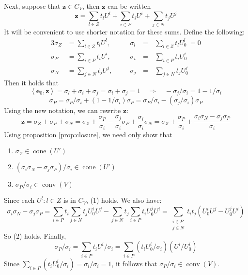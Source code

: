 \documentclass[fleqn]{article}
\renewcommand{\vec}[1]{\mathbf{#1}}
\DeclareMathOperator{\cone}{cone}
\DeclareMathOperator{\conv}{conv}
\newcommand{\ip}[2]{\left\langle #1, #2 \right\rangle}
\newcommand{\0}{\vec{0}}
\newcommand{\z}{\vec{z}}
\newcommand{\e}{\vec{e}}
\newcommand{\Uiz}{U^i_{0}}
\newcommand{\Ujz}{U^j_{0}}
\newcommand{\Ulz}{U^l_{0}}
\newcommand{\Psum}{\sum_{i\in P}}
\newcommand{\Nsum}{\sum_{j\in N}}
\newcommand{\Zsum}{\sum_{l\in Z}}
\newcommand{\NPsum}{\sum_{\substack{i\in P \\ j\in N}}}
\begin{document}
Next, suppose that $\z \in C_V$, then $\z$ can be written
\[ \z = \Zsum t_l U^l + \Psum t_i U^i + \Nsum t_j U^j \]
It will be convenient to use shorter notation for these sums.  Define the following:
\begin{alignat*}{3}
  \sigma_Z &= \Zsum t_l U^l, \quad &&\sigma_l \,&=&\, \Zsum t_l \Ulz \;= 0\\
  \sigma_P &= \Psum t_i U^i, \quad &&\sigma_i \,&=&\, \Psum t_i \Uiz \\
  \sigma_N &= \Nsum t_j U^j, \quad &&\sigma_j \,&=&\, \Nsum t_j \Ujz
\end{alignat*}
Then it holds that
\[ \ip{\e_0}{\z} = \sigma_l + \sigma_i + \sigma_j = \sigma_i + \sigma_j = 1 
      \quad\Rightarrow\quad -\sigma_j/\sigma_i = 1 - 1/\sigma_i \]
\[ \sigma_P = \sigma_P/\sigma_i + (1-1/\sigma_i)\sigma_P 
            = \sigma_P/\sigma_i - (\sigma_j/\sigma_i)\sigma_P \]
Using the new notation, we can rewrite $\z$:
\[ \z = \sigma_Z + \sigma_P + \sigma_N 
      = \sigma_Z + \frac{\sigma_P}{\sigma_i} - \frac{\sigma_j}{\sigma_i}\sigma_P
                 + \frac{\sigma_i}{\sigma_i}\sigma_N 
      = \sigma_Z + \frac{\sigma_P}{\sigma_i} + 
                   \frac{\sigma_i\sigma_N - \sigma_j\sigma_P}{\sigma_i}
\]
Using proposition \ref{prop:closure}, we need only show that 
\begin{enumerate}
  \item $\sigma_Z \in \cone(U')$
  \item $(\sigma_i\sigma_N - \sigma_j\sigma_P)/\sigma_i \in \cone(U')$ 
  \item $\sigma_P/\sigma_i \in \conv(V)$
\end{enumerate}
Since each $U^l : l \in Z$ is in $C_V$, (1) holds.  We also have:
\[ \sigma_i\sigma_N - \sigma_j\sigma_P = 
    \Psum t_i \Nsum t_j \Uiz U^j - \Nsum t_j \Psum t_i \Ujz U^i = 
    \NPsum t_i t_j(\Uiz U^j - \Ujz U^i) \]
So (2) holds.  Finally,
\[ \sigma_P/\sigma_i = \Psum t_i U^i / \sigma_i = \Psum (t_i \Uiz/\sigma_i)(U^i/\Uiz) \]
Since $\Psum (t_i \Uiz/\sigma_i) = \sigma_i / \sigma_i = 1$, it follows that $\sigma_P / \sigma_i \in \conv(V)$.
\end{document}
